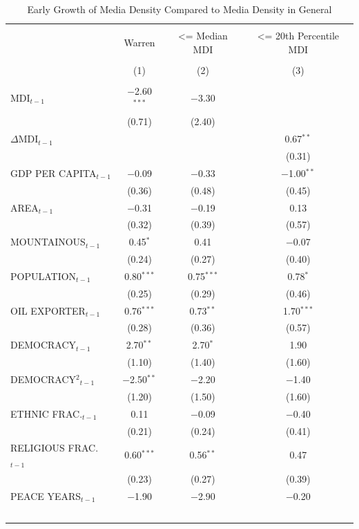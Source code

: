 \documentclass[11pt,article,oneside]{memoir}
\begin{document}
\begin{table}[!htbp] \centering 
  \caption{Early Growth of Media Density Compared to Media Density in General} 
  \label{} 
\scriptsize 
\begin{tabular}{@{\extracolsep{5pt}}lccc} 
\\[-1.8ex]\hline \\[-1.8ex] 
 & Warren & <= Median MDI & <= 20th Percentile MDI \\ 
\\[-1.8ex] & (1) & (2) & (3)\\ 
\hline \\[-1.8ex] 
 MDI$_{t-1}$ & $-$2.60$^{***}$ & $-$3.30 &  \\ 
  & (0.71) & (2.40) &  \\ 
  $\Delta$MDI$_{t-1}$ &  &  & 0.67$^{**}$ \\ 
  &  &  & (0.31) \\ 
  GDP PER CAPITA$_{t-1}$ & $-$0.09 & $-$0.33 & $-$1.00$^{**}$ \\ 
  & (0.36) & (0.48) & (0.45) \\ 
  AREA$_{t-1}$ & $-$0.31 & $-$0.19 & 0.13 \\ 
  & (0.32) & (0.39) & (0.57) \\ 
  MOUNTAINOUS$_{t-1}$ & 0.45$^{*}$ & 0.41 & $-$0.07 \\ 
  & (0.24) & (0.27) & (0.40) \\ 
  POPULATION$_{t-1}$ & 0.80$^{***}$ & 0.75$^{***}$ & 0.78$^{*}$ \\ 
  & (0.25) & (0.29) & (0.46) \\ 
  OIL EXPORTER$_{t-1}$ & 0.76$^{***}$ & 0.73$^{**}$ & 1.70$^{***}$ \\ 
  & (0.28) & (0.36) & (0.57) \\ 
  DEMOCRACY$_{t-1}$ & 2.70$^{**}$ & 2.70$^{*}$ & 1.90 \\ 
  & (1.10) & (1.40) & (1.60) \\ 
  DEMOCRACY$^2$$_{t-1}$ & $-$2.50$^{**}$ & $-$2.20 & $-$1.40 \\ 
  & (1.20) & (1.50) & (1.60) \\ 
  ETHNIC FRAC.$_{t-1}$ & 0.11 & $-$0.09 & $-$0.40 \\ 
  & (0.21) & (0.24) & (0.41) \\ 
  RELIGIOUS FRAC.$_{t-1}$ & 0.60$^{***}$ & 0.56$^{**}$ & 0.47 \\ 
  & (0.23) & (0.27) & (0.39) \\ 
  PEACE YEARS$_{t-1}$ & $-$1.90 & $-$2.90 & $-$0.20 \\ 
$$
\end{tabular}
\end{table}
\end{document}
